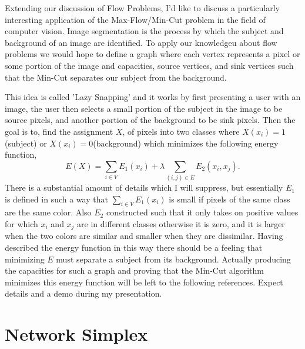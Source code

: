 \documentclass[12pt]{amsart}
\begin{document}
Extending our discussion of Flow Problems, I'd like to discuss a particularly interesting application of the Max-Flow/Min-Cut problem in the field of computer vision. Image segmentation is the process by which the subject and background of an image are identified. To apply our knowledgeu about flow problems we would hope to define a graph where each vertex represents a pixel or some portion of the image and capacities, source vertices, and sink vertices such that the Min-Cut separates our subject from the background. 

This idea is called 'Lazy Snapping' and it works by first presenting a user with an image, the user then selects a small portion of the subject in the image to be source pixels, and another portion of the background to be sink pixels. Then the goal is to, find the assignment $X$, of pixels into two classes where $X(x_i) = 1$ (subject) or $X(x_i) = 0$(background) which minimizes the following energy function, 
\begin{equation*}
    E(X) = \sum_{i \in V} E_1(x_i) + \lambda \sum_{(i, j) \in E} E_2(x_i, x_j). 
\end{equation*}
There is a substantial amount of details which I will suppress, but essentially $E_1$ is defined in such a way that $\sum_{i \in V} E_1(x_i)$ is small if pixels of the same class are the same color. Also $E_2$ constructed such that it only takes on positive values for which $x_i$ and $x_j$ are in different classes otherwise it is zero, and it is larger when the two colors are similar and smaller when they are dissimilar. Having described the energy function in this way there should be a feeling that minimizing $E$ must separate a subject from its background. Actually producing the capacities for such a graph and proving that the Min-Cut algorithm minimizes this energy function will be left to the following references. Expect details and a demo during my presentation.
\newpage









\appendix
\section{Network Simplex}
\end{document}
